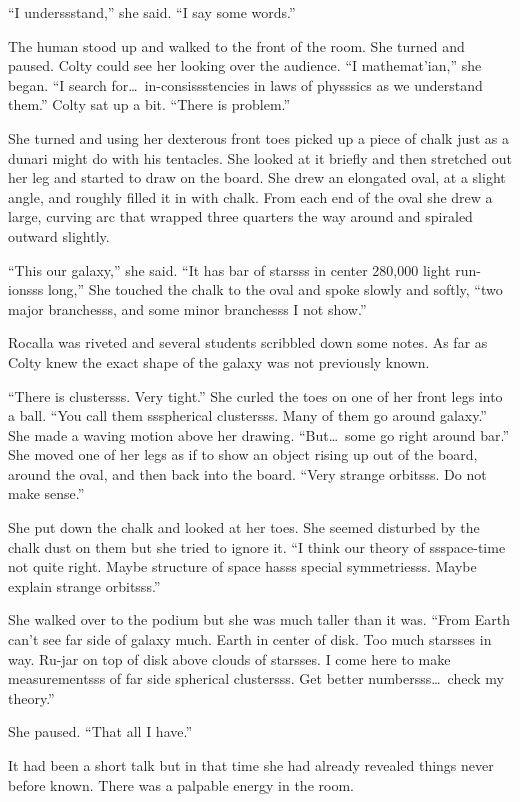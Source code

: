 ``I underssstand,'' she said. ``I say some words.''

The human stood up and walked to the front of the room. She turned and paused. Colty could see
her looking over the audience. ``I mathemat'ian,'' she began. ``I search for\ldots\
in-consissstencies in laws of physssics as we understand them.'' Colty sat up a bit. ``There is
problem.''

She turned and using her dexterous front toes picked up a piece of chalk just as a dunari might
do with his tentacles. She looked at it briefly and then stretched out her leg and started to
draw on the board. She drew an elongated oval, at a slight angle, and roughly filled it in with
chalk. From each end of the oval she drew a large, curving arc that wrapped three quarters the
way around and spiraled outward slightly.

``This our galaxy,'' she said. ``It has bar of starsss in center 280,000 light run-ionsss
long,'' She touched the chalk to the oval and spoke slowly and softly, ``two major branchesss,
and some minor branchesss I not show.''

Rocalla was riveted and several students scribbled down some notes. As far as Colty knew the
exact shape of the galaxy was not previously known.

``There is clustersss. Very tight.'' She curled the toes on one of her front legs into a ball.
``You call them ssspherical clustersss. Many of them go around galaxy.'' She made a waving
motion above her drawing. ``But\ldots\ some go right around bar.'' She moved one of her legs as
if to show an object rising up out of the board, around the oval, and then back into the board.
``Very strange orbitsss. Do not make sense.''

She put down the chalk and looked at her toes. She seemed disturbed by the chalk dust on them
but she tried to ignore it. ``I think our theory of ssspace-time not quite right. Maybe
structure of space hasss special symmetriesss. Maybe explain strange orbitsss.''

She walked over to the podium but she was much taller than it was. ``From Earth can't see far
side of galaxy much. Earth in center of disk. Too much starsses in way. Ru-jar on top of disk
above clouds of starsses. I come here to make measurementsss of far side spherical clustersss.
Get better numbersss\ldots\ check my theory.''

She paused. ``That all I have.''

It had been a short talk but in that time she had already revealed things never before known.
There was a palpable energy in the room.

